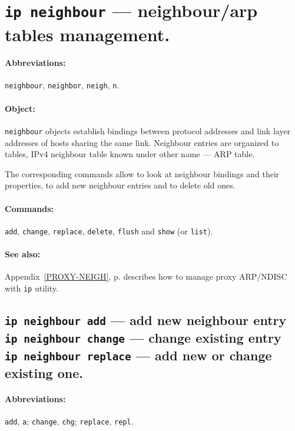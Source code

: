 \section{{\tt ip neighbour} --- neighbour/arp tables management.}

\paragraph{Abbreviations:} \verb|neighbour|, \verb|neighbor|, \verb|neigh|,
\verb|n|.

\paragraph{Object:} \verb|neighbour| objects establish bindings between protocol
addresses and link layer addresses of hosts sharing the same link.
Neighbour entries are organized to tables, IPv4 neighbour table
known under other name --- ARP table.

The corresponding commands allow to look at neighbour bindings
and their properties, to add new neighbour entries and to delete old ones.

\paragraph{Commands:} \verb|add|, \verb|change|, \verb|replace|,
\verb|delete|, \verb|flush| and \verb|show| (or \verb|list|).

\paragraph{See also:} Appendix~\ref{PROXY-NEIGH}, p.\pageref{PROXY-NEIGH}
describes how to manage proxy ARP/NDISC with \verb|ip| utility.


\subsection{{\tt ip neighbour add} --- add new neighbour entry\\
	{\tt ip neighbour change} --- change existing entry\\
	{\tt ip neighbour replace} --- add new or change existing one.}

\paragraph{Abbreviations:} \verb|add|, \verb|a|; \verb|change|, \verb|chg|;
\verb|replace|,	\verb|repl|.

